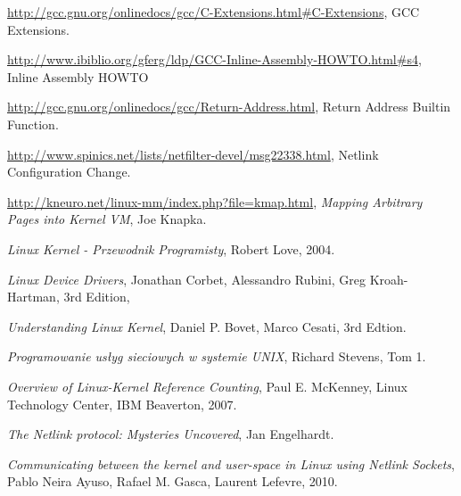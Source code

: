 \documentclass[11pt]{scrartcl}
\begin{document}
\begin{thebibliography}{99}

    \url{http://gcc.gnu.org/onlinedocs/gcc/C-Extensions.html#C-Extensions},
    GCC Extensions.

    \url{http://www.ibiblio.org/gferg/ldp/GCC-Inline-Assembly-HOWTO.html#s4},
    Inline Assembly HOWTO

    \url{http://gcc.gnu.org/onlinedocs/gcc/Return-Address.html},
    Return Address Builtin Function.

    \url{http://www.spinics.net/lists/netfilter-devel/msg22338.html},
    Netlink Configuration Change.

    \url{http://kneuro.net/linux-mm/index.php?file=kmap.html},
    \textit{Mapping Arbitrary Pages into Kernel VM},
    Joe Knapka.

    \textit{Linux Kernel - Przewodnik Programisty},
    Robert Love,
    2004.

    \textit{Linux Device Drivers},
    Jonathan Corbet, Alessandro Rubini, Greg Kroah-Hartman,
    3rd Edition,

    \textit{Understanding Linux Kernel},
    Daniel P. Bovet, Marco Cesati,
    3rd Edtion.

    \textit{Programowanie usłyg sieciowych w systemie UNIX},
    Richard Stevens,
    Tom 1.

    \textit{Overview of Linux-Kernel Reference Counting},
    Paul E. McKenney,
    Linux Technology Center,
    IBM Beaverton,
    2007.

    \textit{The Netlink protocol: Mysteries Uncovered},
    Jan Engelhardt.

    \textit{Communicating between the kernel and user-space in Linux using Netlink Sockets},
    Pablo Neira Ayuso, Rafael M. Gasca, Laurent Lefevre,
    2010.

\end{thebibliography}

\listoffigures
\end{document}
